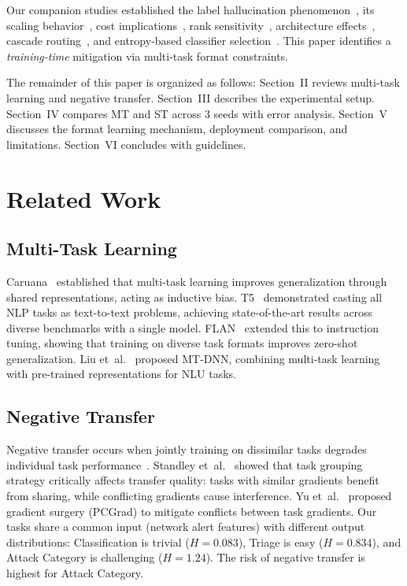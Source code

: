 \documentclass[review,3p]{elsarticle}
\begin{document}
Our companion studies established the label hallucination phenomenon~\cite{p3}, its scaling behavior~\cite{p6}, cost implications~\cite{p7}, rank sensitivity~\cite{p22}, architecture effects~\cite{p21}, cascade routing~\cite{p5}, and entropy-based classifier selection~\cite{p8}. This paper identifies a \emph{training-time} mitigation via multi-task format constraints.

The remainder of this paper is organized as follows: Section~II reviews multi-task learning and negative transfer. Section~III describes the experimental setup. Section~IV compares MT and ST across 3 seeds with error analysis. Section~V discusses the format learning mechanism, deployment comparison, and limitations. Section~VI concludes with guidelines.

\section{Related Work}

\subsection{Multi-Task Learning}
Caruana~\cite{caruana1997} established that multi-task learning improves generalization through shared representations, acting as inductive bias. T5~\cite{raffel2020} demonstrated casting all NLP tasks as text-to-text problems, achieving state-of-the-art results across diverse benchmarks with a single model. FLAN~\cite{wei2022} extended this to instruction tuning, showing that training on diverse task formats improves zero-shot generalization. Liu et~al.~\cite{liu2019} proposed MT-DNN, combining multi-task learning with pre-trained representations for NLU tasks.

\subsection{Negative Transfer}
Negative transfer occurs when jointly training on dissimilar tasks degrades individual task performance~\cite{zhang2022}. Standley et~al.~\cite{standley2020} showed that task grouping strategy critically affects transfer quality: tasks with similar gradients benefit from sharing, while conflicting gradients cause interference. Yu et~al.~\cite{yu2020} proposed gradient surgery (PCGrad) to mitigate conflicts between task gradients. Our tasks share a common input (network alert features) with different output distributions: Classification is trivial ($H = 0.083$), Triage is easy ($H = 0.834$), and Attack Category is challenging ($H = 1.24$). The risk of negative transfer is highest for Attack Category.
\end{document}
